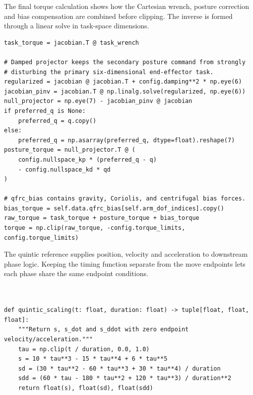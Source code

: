 \documentclass[12pt,a4paper]{article}
\begin{document}
The final torque calculation shows how the Cartesian wrench, posture correction and bias compensation are combined before clipping. The inverse is formed through a linear solve in task-space dimensions.

\begin{lstlisting}[caption={Torque mapping, damped posture projection and actuator clipping.}]
task_torque = jacobian.T @ task_wrench

# Damped projector keeps the secondary posture command from strongly
# disturbing the primary six-dimensional end-effector task.
regularized = jacobian @ jacobian.T + config.damping**2 * np.eye(6)
jacobian_pinv = jacobian.T @ np.linalg.solve(regularized, np.eye(6))
null_projector = np.eye(7) - jacobian_pinv @ jacobian
if preferred_q is None:
    preferred_q = q.copy()
else:
    preferred_q = np.asarray(preferred_q, dtype=float).reshape(7)
posture_torque = null_projector.T @ (
    config.nullspace_kp * (preferred_q - q)
    - config.nullspace_kd * qd
)

# qfrc_bias contains gravity, Coriolis, and centrifugal bias forces.
bias_torque = self.data.qfrc_bias[self.arm_dof_indices].copy()
raw_torque = task_torque + posture_torque + bias_torque
torque = np.clip(raw_torque, -config.torque_limits, config.torque_limits)
\end{lstlisting}

The quintic reference supplies position, velocity and acceleration to downstream phase logic. Keeping the timing function separate from the move endpoints lets each phase share the same endpoint conditions.

\begin{lstlisting}[caption={Quintic time scaling used by the stacking phase generator.}]


def quintic_scaling(t: float, duration: float) -> tuple[float, float, float]:
    """Return s, s_dot and s_ddot with zero endpoint velocity/acceleration."""
    tau = np.clip(t / duration, 0.0, 1.0)
    s = 10 * tau**3 - 15 * tau**4 + 6 * tau**5
    sd = (30 * tau**2 - 60 * tau**3 + 30 * tau**4) / duration
    sdd = (60 * tau - 180 * tau**2 + 120 * tau**3) / duration**2
    return float(s), float(sd), float(sdd)
\end{lstlisting}
\end{document}
